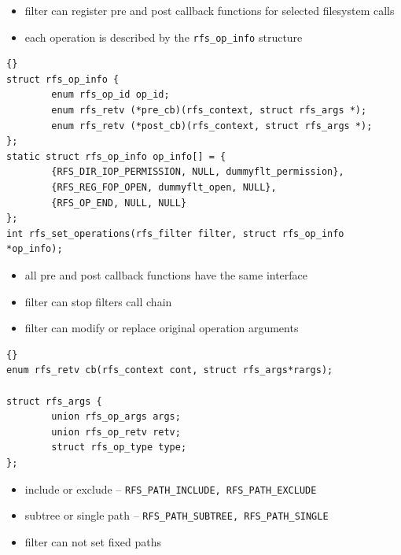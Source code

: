 \documentclass[30pt,a4paper,landscape,headrule,footrule]{foils}
\begin{document}
\begin{itemize}
\item filter can register pre and post callback functions for selected
filesystem calls
\item each operation is described by the \texttt{rfs\_op\_info} structure
\end{itemize}

\begin{lstlisting}[frame=trbl]{}
struct rfs_op_info {
        enum rfs_op_id op_id;
        enum rfs_retv (*pre_cb)(rfs_context, struct rfs_args *);
        enum rfs_retv (*post_cb)(rfs_context, struct rfs_args *);
};
static struct rfs_op_info op_info[] = {
        {RFS_DIR_IOP_PERMISSION, NULL, dummyflt_permission},
        {RFS_REG_FOP_OPEN, dummyflt_open, NULL},
        {RFS_OP_END, NULL, NULL}
};
int rfs_set_operations(rfs_filter filter, struct rfs_op_info *op_info);
\end{lstlisting}


\begin{itemize}
\item all pre and post callback functions have the same interface
\item filter can stop filters call chain
\item filter can modify or replace original operation arguments
\end{itemize}

\begin{lstlisting}[frame=trbl]{}
enum rfs_retv cb(rfs_context cont, struct rfs_args*rargs);

struct rfs_args {
        union rfs_op_args args;
        union rfs_op_retv retv;
        struct rfs_op_type type;
};
\end{lstlisting}

\begin{itemize}
\item include or exclude -- \texttt{\small{RFS\_PATH\_INCLUDE,
RFS\_PATH\_EXCLUDE}}
\item subtree or single path -- \texttt{\small{RFS\_PATH\_SUBTREE,
RFS\_PATH\_SINGLE}}
\item filter can not set fixed paths
\end{itemize}
\end{document}
